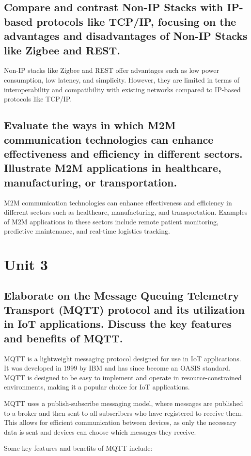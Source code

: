 \documentclass[12pt, a4paper, oneside]{article}
\begin{document}
\subsection{Compare and contrast Non-IP Stacks with IP-based protocols like TCP/IP, focusing on the advantages and disadvantages of Non-IP Stacks like Zigbee and REST.}
Non-IP stacks like Zigbee and REST offer advantages such as low power consumption, low latency, and simplicity. However, they are limited in terms of interoperability and compatibility with existing networks compared to IP-based protocols like TCP/IP.

\subsection{Evaluate the ways in which M2M communication technologies can enhance effectiveness and efficiency in different sectors. Illustrate M2M applications in healthcare, manufacturing, or transportation.}
M2M communication technologies can enhance effectiveness and efficiency in different sectors such as healthcare, manufacturing, and transportation. Examples of M2M applications in these sectors include remote patient monitoring, predictive maintenance, and real-time logistics tracking.

\section{Unit 3}

\subsection{Elaborate on the Message Queuing Telemetry Transport (MQTT) protocol and its utilization in IoT applications. Discuss the key features and benefits of MQTT.}

MQTT is a lightweight messaging protocol designed for use in IoT applications. It was developed in 1999 by IBM and has since become an OASIS standard. MQTT is designed to be easy to implement and operate in resource-constrained environments, making it a popular choice for IoT applications.

MQTT uses a publish-subscribe messaging model, where messages are published to a broker and then sent to all subscribers who have registered to receive them. This allows for efficient communication between devices, as only the necessary data is sent and devices can choose which messages they receive.

Some key features and benefits of MQTT include:
\end{document}

